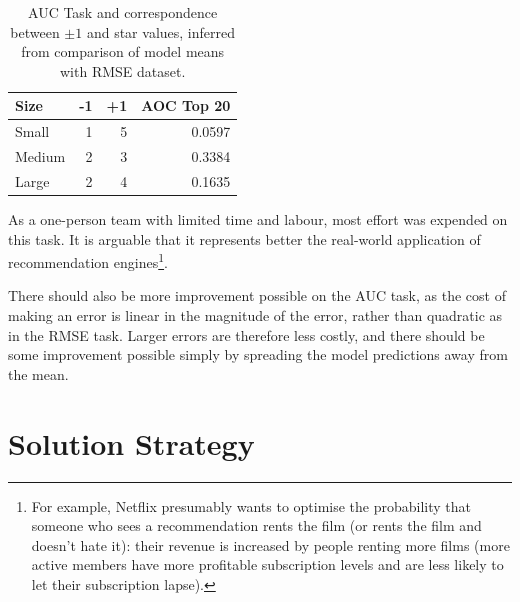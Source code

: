 \documentclass{article}
\begin{document}

\begin{table}[t]
\caption{AUC Task and correspondence between $\pm 1$ and star values, inferred from comparison of model means with RMSE dataset.}
\label{auc}
\vskip 0.15in
\begin{center}
\begin{small}
\begin{sc}
\begin{tabular}{lrrr}
\hline
\abovespace\belowspace
Size & -1 & +1 & AOC Top 20 \\
\hline
\abovespace
Small    & 1 & 5 & 0.0597 \\
Medium   & 2 & 3 & 0.3384 \\
\belowspace
Large    & 2 & 4 & 0.1635 \\
\hline
\end{tabular}
\end{sc}
\end{small}
\end{center}
\vskip -0.1in
\end{table}

As a one-person team with limited time and labour, most effort was expended on this task.  It is arguable that it represents better the real-world application of recommendation engines\footnote{For example, Netflix presumably wants to optimise the probability that someone who sees a recommendation rents the film (or rents the film and doesn't hate it): their revenue is increased by people renting more films (more active members have more profitable subscription levels and are less likely to let their subscription lapse).}.

There should also be more improvement possible on the AUC task, as the cost of making an error is linear in the magnitude of the error, rather than quadratic as in the RMSE task.  Larger errors are therefore less costly, and there should be some improvement possible simply by spreading the model predictions away from the mean.

\section{Solution Strategy}
\end{document}
